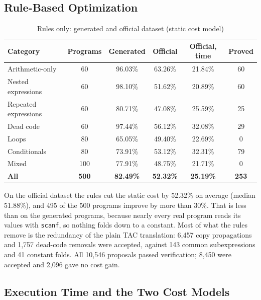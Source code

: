 \documentclass[12pt,a4paper]{report}
\begin{document}
\subsection{Rule-Based Optimization}

\begin{table}[H]
\centering
\caption{Rules only: generated and official dataset (static cost model)}
\label{tab:realrules}
\small
\begin{tabular}{|l|c|c|c|c|c|}
\hline
\textbf{Category} & \textbf{Programs} & \textbf{Generated} & \textbf{Official} & \textbf{Official, time} & \textbf{Proved} \\
\hline
Arithmetic-only & 60 & 96.03\% & 63.26\% & 21.84\% & 60 \\
\hline
Nested expressions & 60 & 98.10\% & 51.62\% & 20.89\% & 60 \\
\hline
Repeated expressions & 60 & 80.71\% & 47.08\% & 25.59\% & 25 \\
\hline
Dead code & 60 & 97.44\% & 56.12\% & 32.08\% & 29 \\
\hline
Loops & 80 & 65.05\% & 49.40\% & 22.69\% & 0 \\
\hline
Conditionals & 80 & 73.91\% & 53.12\% & 32.31\% & 79 \\
\hline
Mixed & 100 & 77.91\% & 48.75\% & 21.71\% & 0 \\
\hline
\textbf{All} & \textbf{500} & \textbf{82.49\%} & \textbf{52.32\%} & \textbf{25.19\%} & \textbf{253} \\
\hline
\end{tabular}
\end{table}

On the official dataset the rules cut the static cost by 52.32\% on average (median 51.88\%), and 495 of the 500 programs improve by more than 30\%. That is less than on the generated programs, because nearly every real program reads its values with \texttt{scanf}, so nothing folds down to a constant. Most of what the rules remove is the redundancy of the plain TAC translation: 6,457 copy propagations and 1,757 dead-code removals were accepted, against 143 common subexpressions and 41 constant folds. All 10,546 proposals passed verification; 8,450 were accepted and 2,096 gave no cost gain.

\subsection{Execution Time and the Two Cost Models}
\end{document}
